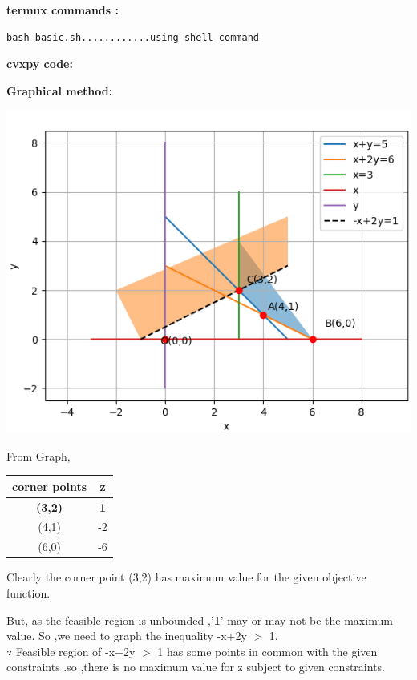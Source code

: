 \documentclass[10pt, a4paper]{article}
\begin{document}
\vspace{20cm}
\textbf{termux commands :}
\begin{lstlisting}
bash basic.sh............using shell command
\end{lstlisting}

\textbf{cvxpy code:}
\begin{center}
\end{center}

\textbf{Graphical method:}
\begin{center}
   {\includegraphics[scale=0.5]{image.png}}  
\end{center}
From Graph,
\begin{center}
\begin{tabular}{|c|c|}
	\hline
	corner points&z\\
	\hline
	\textbf{(3,2)}&\textbf{1}\\
	\hline
    (4,1)&-2\\
    \hline
    (6,0)&-6\\
	\hline
\end{tabular}
\end{center}

Clearly the corner point (3,2) has maximum value for the given objective function.

But, as the feasible region is unbounded ,'\textbf{1}' may or may not be the maximum value. So ,we need to graph the inequality -x+2y $>$ 1.\\
$\because$ Feasible region of -x+2y $>$ 1 has some  points in common with the given constraints .so ,there is no maximum value for  z subject to given constraints.
\end{document}
